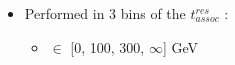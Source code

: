{{        \small        
        \begin{itemize}
          \footnotesize
        \item Performed in 3 bins of the $t^{res}_{assoc}$ \pT:
          \begin{itemize}
            \footnotesize
          \item \pT $\in$ [0, 100, 300, $\infty$] GeV \FixmeTag
          \end{itemize}          
        \end{itemize}        
      }
      {

        \vspace{-1.6cm}
        
      }

}


